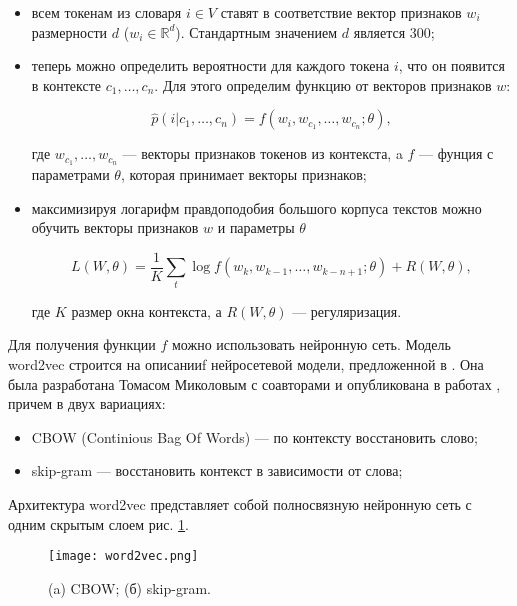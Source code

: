 \bigskip
\begin{itemize}
 \item всем токенам из словаря $i \in V$ ставят в соответствие вектор признаков $w_i$ размерности $d$ ($w_i \in \mathds{R}^d$). Стандартным значением $d$ является 300;

 \item теперь можно определить вероятности для каждого токена $i$, что он появится в контексте $c_1, \ldots, c_n$. Для этого определим функцию от векторов признаков $w$:

 \begin{equation}
  \hat{p}(i|c_1, \ldots, c_n) = f(w_i, w_{c_1}, \ldots, w_{c_n}; \theta),
 \end{equation}

 где $w_{c_1}, \ldots, w_{c_n}$ --- векторы признаков токенов из контекста, a $f$ --- фунция с параметрами $\theta$, которая принимает векторы признаков;

 \item максимизируя логарифм правдоподобия большого корпуса текстов можно обучить векторы признаков $w$ и параметры $\theta$

 \begin{equation}
  L(W, \theta) = \frac{1}{K}\sum_t \log{f(w_k, w_{k-1}, \ldots, w_{k-n+1}; \theta) + R(W, \theta)},
 \end{equation}

 где $K$ размер окна контекста, а $R(W, \theta)$ --- регуляризация.

\end{itemize}

\bigskip
Для получения функции $f$ можно использовать нейронную сеть. Модель word2vec строится на описанииf нейросетевой модели, предложенной в \cite{Bengio}. Она была разработана Томасом Миколовым с соавторами и опубликована в работах \cite{Mikolov:1, Mikolov:2}, причем в двух вариациях:

\bigskip
\begin{itemize}
 \item CBOW (Continious Bag Of Words) --- по контексту восстановить слово;
 \item skip-gram --- восстановить контекст в зависимости от слова;
\end{itemize}

\bigskip
Архитектура word2vec представляет собой полносвязную нейронную сеть с одним скрытым слоем рис. \ref{fig:word2vec}.

\begin{figure}[ht]
    \centering
    \texttt{[image: word2vec.png]}
    \caption{(a) CBOW; (б) skip-gram.}
    \label{fig:word2vec}
\end{figure}

